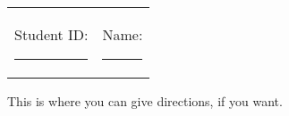 \documentclass[12pt]{exam}
\begin{document}




\noindent
\begin{table}[h]
\begin{tabular}{lr}
Student ID: \rule{1.5in}{1pt} & Name: \rule{3.25in}{1pt}
\end{tabular}
\end{table}

\begin{tcolorbox}[valign=center, box align=center, title=Instructions]
This is where you can give directions, if you want.
\end{tcolorbox}
\end{document}
